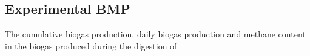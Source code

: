 \subsection{Experimental BMP}
The cumulative biogas production, daily biogas production and methane content in the biogas produced during the digestion of 